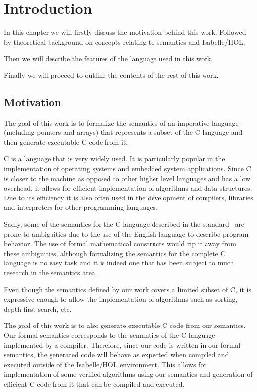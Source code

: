 \chapter{Introduction}\label{chapter:introduction}

In this chapter we will firstly discuss the motivation behind this work.
Followed by theoretical background on concepts relating to semantics and Isabelle/HOL.

Then we will describe the features of the language used in this work.

Finally we will proceed to outline the contents of the rest of this work.

\section{Motivation}

The goal of this work is to formalize the semantics of an imperative language (including pointers and arrays) that represents a subset of the C language and then generate executable C code from it.

C is a language that is very widely used.
It is particularly popular in the implementation of operating systems and embedded system applications.
Since C is closer to the machine as opposed to other higher level languages and has a low overhead, it allows for efficient implementation of algorithms and data structures.
Due to its efficiency it is also often used in the development of compilers, libraries and interpreters for other programming languages.

Sadly, some of the semantics for the C language described in the standard~\parencite{c99} are prone to ambiguities due to the use of the English language to describe program behavior.
The use of formal mathematical constructs would rip it away from these ambiguities, although formalizing the semantics for the complete C language is no easy task and it is indeed one that has been subject to much research in the semantics area.

Even though the semantics defined by our work covers a limited subset of C, it is expressive enough to allow the implementation of algorithms such as sorting, depth-first search, etc.

The goal of this work is to also generate executable C code from our semantics.
Our formal semantics corresponds to the semantics of the C language implemented by a compiler.
Therefore, since our code is written in our formal semantics, the generated code will behave as expected when compiled and executed outside of the Isabelle/HOL environment.
This allows for implementation of some verified algorithms using our semantics and generation of efficient C code from it that can be compiled and executed.

